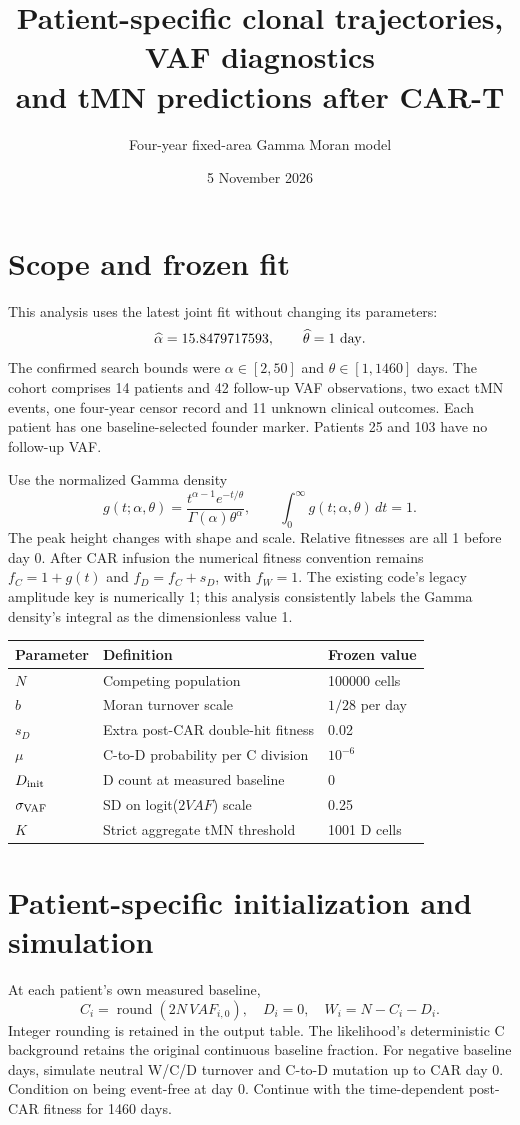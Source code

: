 \documentclass[11pt]{article}
\title{Patient-specific clonal trajectories, VAF diagnostics\\and tMN predictions after CAR-T}
\author{Four-year fixed-area Gamma Moran model}\date{5 November 2026}
\begin{document}
\maketitle
\section{Scope and frozen fit}
This analysis uses the latest joint fit without changing its parameters:
\[
\widehat\alpha=15.8479717593,\qquad \widehat\theta=1\ {\rm day}.
\]
The confirmed search bounds were $\alpha\in[2,50]$ and $\theta\in[1,1460]$ days.
The cohort comprises 14 patients and 42 follow-up VAF observations, two exact tMN events, one four-year censor record and 11 unknown clinical outcomes.
Each patient has one baseline-selected founder marker. Patients 25 and 103 have no follow-up VAF.

Use the normalized Gamma density
\[
g(t;\alpha,\theta)=
\frac{t^{\alpha-1}e^{-t/\theta}}{\Gamma(\alpha)\theta^\alpha},
\qquad \int_0^\infty g(t;\alpha,\theta)\,dt=1.
\]
The peak height changes with shape and scale. Relative fitnesses are all 1 before day 0. After CAR infusion the numerical fitness convention remains $f_C=1+g(t)$ and $f_D=f_C+s_D$, with $f_W=1$. The existing code's legacy amplitude key is numerically 1; this analysis consistently labels the Gamma density's integral as the dimensionless value 1.

\begin{center}\begin{tabular}{lll}\toprule
Parameter & Definition & Frozen value\\\midrule
$N$ & Competing population & 100000 cells\\
$b$ & Moran turnover scale & $1/28$ per day\\
$s_D$ & Extra post-CAR double-hit fitness & 0.02\\
$\mu$ & C-to-D probability per C division & $10^{-6}$\\
$D_{\rm init}$ & D count at measured baseline & 0\\
$\sigma_{\rm VAF}$ & SD on logit($2VAF$) scale & 0.25\\
$K$ & Strict aggregate tMN threshold & 1001 D cells\\\bottomrule
\end{tabular}\end{center}

\section{Patient-specific initialization and simulation}
At each patient's own measured baseline,
\[
C_i=\operatorname{round}(2N\,VAF_{i,0}),\quad D_i=0,\quad W_i=N-C_i-D_i.
\]
Integer rounding is retained in the output table. The likelihood's deterministic C background retains the original continuous baseline fraction.
For negative baseline days, simulate neutral W/C/D turnover and C-to-D mutation up to CAR day 0. Condition on being event-free at day 0. Continue with the time-dependent post-CAR fitness for 1460 days.
\end{document}
